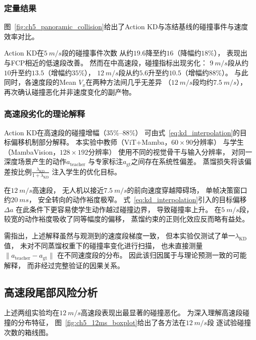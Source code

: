 \subsubsection{定量结果}

图~\ref{fig:ch5_panoramic_collision}给出了Action KD与冻结基线的碰撞事件与速度效率对比。

Action KD在$\SI{5}{m/s}$段的碰撞事件次数
从约$19.6$降至约$16$（降幅约$18\%$），
表现出与FCP相近的低速段改善。
然而在中高速段，碰撞指标出现劣化：
$\SI{9}{m/s}$段从约$10$升至约$13.5$（增幅约$35\%$），
$\SI{12}{m/s}$段从约$5.6$升至约$10.5$（增幅约$88\%$）。
与此同时，各速度段的Mean $V_x$在两种方法间几乎无差异
（$\SI{12}{m/s}$段均约$\SI{7.5}{m/s}$），
再次确认碰撞恶化并非速度变化的副产物。

\subsubsection{高速段劣化的理论解释}

Action KD在高速段的碰撞增幅（$35\%$--$88\%$）
可由式~\eqref{eq:kd_interpolation}的目标偏移机制部分解释。
本实验中教师（ViT+Mamba，$60\times90$分辨率）
与学生（MambaVision，$128\times192$分辨率）
使用不同的视觉骨干与输入分辨率，
对同一深度场景产生的动作$a_{\text{teacher}}$
与专家标注$a_{\text{gt}}$之间存在系统性偏差。
蒸馏损失将该偏差按比例$\frac{\lambda_{\text{KD}}}{1+\lambda_{\text{KD}}}$
注入学生的优化目标。

在$\SI{12}{m/s}$高速段，
无人机以接近$\SI{7.5}{m/s}$的前向速度穿越障碍场，
单帧决策窗口约$\SI{20}{ms}$，
安全转向的动作裕度极窄。
式~\eqref{eq:kd_interpolation}引入的目标偏移$\Delta a$
在此条件下更容易使学生动作越过碰撞边界，
导致碰撞率上升。
在$\SI{5}{m/s}$段，
较宽的动作裕度吸收了同等幅度的偏移，
蒸馏约束的正则化效应反而略有益处。

需指出，上述解释虽然与观测到的速度段梯度一致，
但本实验仅测试了单一$\lambda_{\text{KD}}$值，
未对不同蒸馏权重下的碰撞率变化进行扫描，
也未直接测量$\|a_{\text{teacher}} - a_{\text{gt}}\|$
在不同速度段的分布。
因此该归因属于与理论预测一致的可能解释，
而非经过完整验证的因果关系。

\subsection{高速段尾部风险分析}

上述两组实验均在$\SI{12}{m/s}$高速段表现出最显著的碰撞恶化。
为深入理解高速段碰撞的分布特征，
图~\ref{fig:ch5_12ms_boxplot}给出了各方法在$\SI{12}{m/s}$段
逐试验碰撞次数的箱线图。

